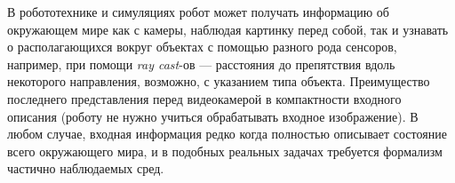 \begin{example}
В робототехнике и симуляциях робот может получать информацию об окружающем мире как с камеры, наблюдая картинку перед собой, так и узнавать о располагающихся вокруг объектах с помощью разного рода сенсоров, например, при помощи \emph{ray cast}-ов --- расстояния до препятствия вдоль некоторого направления, возможно, с указанием типа объекта. Преимущество последнего представления перед видеокамерой в компактности входного описания (роботу не нужно учиться обрабатывать входное изображение). В любом случае, входная информация редко когда полностью описывает состояние всего окружающего мира, и в подобных реальных задачах требуется формализм частично наблюдаемых сред. 
\end{example}